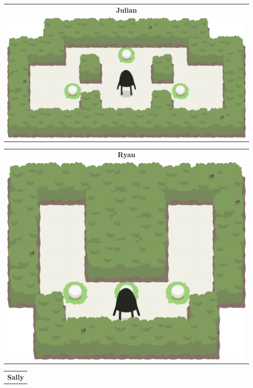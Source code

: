 \documentclass{report}
\theoremstyle{plain}
\begin{document}
\begin{center}
\begin{tabular}{c}
\end{tabular}
\begin{tabular}{c}
\textbf{Julian} \\
\includegraphics[scale=\levelAnnexWidth]{julian-1.png}
\end{tabular}
\begin{tabular}{c}
\textbf{Ryan} \\
\includegraphics[scale=\levelAnnexWidth]{ryan-1.png}
\end{tabular}
\begin{tabular}{c}
\textbf{Sally} \\

\end{tabular}
\end{center}
\end{document}
